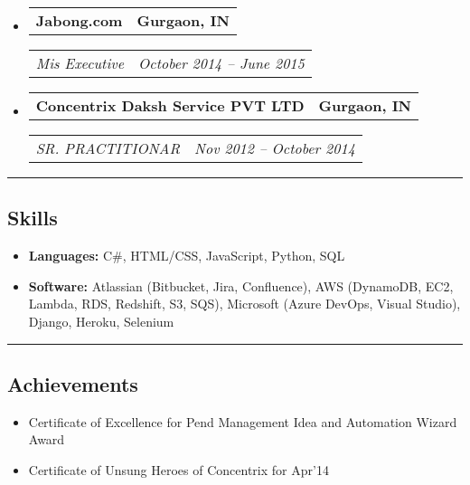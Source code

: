 \documentclass[11pt,letterpaper]{article}
\makeatletter
\newcommand{\headerrow}[2]
{\begin{tabular*}{\linewidth}{l@{\extracolsep{\fill}}r}
#1 &
#2 \\
\end{tabular*}}
\makeatother
\begin{document}
\begin{itemize}[leftmargin=1em]
	\item
	      \headerrow
	      {\textbf{Jabong.com}}
	      {\textbf{Gurgaon, IN}}
	      \headerrow
	      {\emph{Mis Executive}}
	      {\emph{October 2014 -- June 2015}}
	\item
	      \headerrow
	      {\textbf{Concentrix Daksh Service PVT LTD}}
	      {\textbf{Gurgaon, IN}}
	      \headerrow
	      {\emph{SR. PRACTITIONAR}}
	      {\emph{Nov 2012 -- October 2014}}
	      	      
\end{itemize}

\hrule
\vspace{-1em}
\subsection*{\Large Skills}

\begin{itemize}[leftmargin=1em,noitemsep]
	\item \textbf{Languages:}
	      C\#, HTML/CSS, JavaScript, Python, SQL
	\item \textbf{Software:}
	      Atlassian (Bitbucket, Jira, Confluence), AWS (DynamoDB, EC2, Lambda, RDS, Redshift, S3, SQS), Microsoft (Azure DevOps, Visual Studio),  Django, Heroku, Selenium
\end{itemize}

\hrule
\vspace{-1em}
\subsection*{\Large Achievements}

\begin{itemize}[leftmargin=1em,noitemsep]
	\item Certificate of Excellence for Pend Management Idea and Automation Wizard Award
	\item Certificate of Unsung Heroes of Concentrix for Apr’14
\end{itemize}
\end{document}
